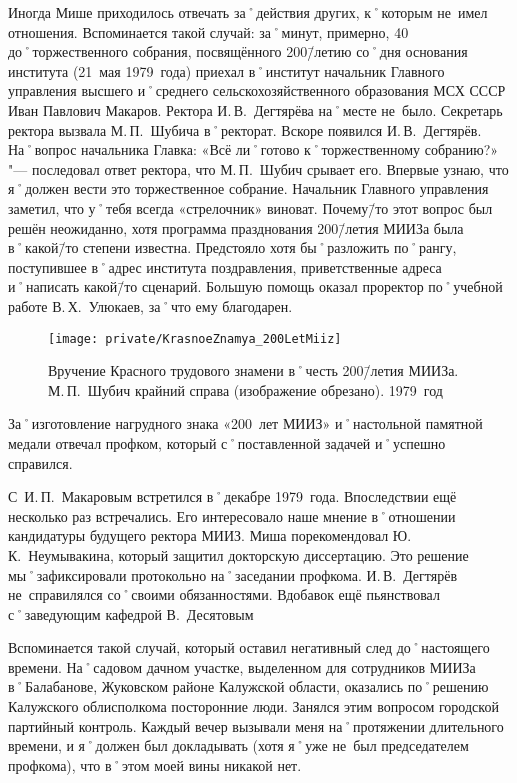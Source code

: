Иногда Мише приходилось отвечать за˚действия других, к˚которым не~имел отношения. Вспоминается такой случай: за˚минут, примерно, 40 до˚торжественного собрания, посвящённого 200\=/летию со˚дня основания института (21~мая 1979~года) приехал в˚институт начальник Главного управления высшего и˚среднего сельскохозяйственного образования МСХ СССР Иван Павлович Макаров. Ректора И.\,В.~Дегтярёва на˚месте не~было. Секретарь ректора вызвала М.\,П.~Шубича в˚ректорат. Вскоре появился И.\,В.~Дегтярёв. На˚вопрос начальника Главка: «Всё ли˚готово к˚торжественному собранию?» "--- последовал ответ ректора, что М.\,П.~Шубич срывает его. Впервые узнаю, что я˚должен вести это торжественное собрание. Начальник Главного управления заметил, что у˚тебя всегда «стрелочник» виноват. Почему\=/то этот вопрос был решён неожиданно, хотя программа празднования 200\=/летия МИИЗа была в˚какой\=/то степени известна. Предстояло хотя бы˚разложить по˚рангу, поступившее в˚адрес института поздравления, приветственные адреса и˚написать какой\=/то сценарий. Большую помощь оказал проректор по˚учебной работе В.\,Х.~Улюкаев, за˚что ему благодарен.

\begin{figure}[h]
\texttt{[image: private/KrasnoeZnamya\_200LetMiiz]}
\caption{Вручение Красного трудового знамени в˚честь 200\=/летия МИИЗа. М.\,П.~Шубич крайний справа (изображение обрезано). 1979~год}
\label{fig:KrasnoeZnamya_200LetMiiz}
\end{figure}

За˚изготовление нагрудного знака «200~лет МИИЗ» и˚настольной памятной медали отвечал профком, который с˚поставленной задачей и˚успешно справился.

С~И.\,П.~Макаровым встретился в˚декабре 1979~года. Впоследствии ещё несколько раз встречались. Его интересовало наше мнение в˚отношении кандидатуры будущего ректора МИИЗ. Миша порекомендовал Ю.\,К.~Неумывакина, который защитил докторскую диссертацию. Это решение мы˚зафиксировали протокольно на˚заседании профкома. И.\,В.~Дегтярёв не~справилялся со˚своими обязанностями. Вдобавок ещё пьянствовал с˚заведующим кафедрой В.~Десятовым

Вспоминается такой случай, который оставил негативный след до˚настоящего времени. На˚садовом дачном участке, выделенном для сотрудников МИИЗа в˚Балабанове, Жуковском районе Калужской области, оказались по˚решению Калужского облисполкома посторонние люди. Занялся этим вопросом городской партийный контроль. Каждый вечер вызывали меня на˚протяжении длительного времени, и я˚должен был докладывать (хотя я˚уже не~был председателем профкома), что в˚этом моей вины никакой нет.

